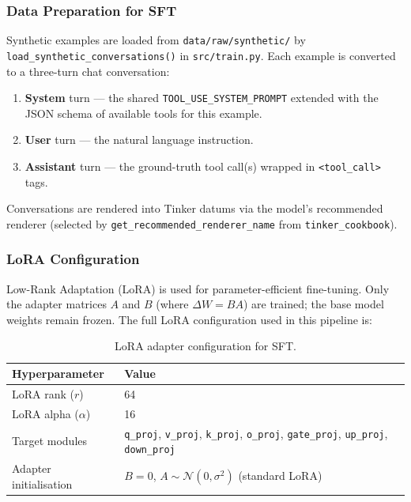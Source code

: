 \documentclass[12pt, a4paper]{article}
\newcommand{\thead}[1]{\textbf{#1}}
\begin{document}
\subsubsection{Data Preparation for SFT}

Synthetic examples are loaded from \texttt{data/raw/synthetic/} by
\texttt{load\_synthetic\_conversations()} in \texttt{src/train.py}. Each
example is converted to a three-turn chat conversation:

\begin{enumerate}[leftmargin=1.5em, itemsep=3pt]
  \item \textbf{System} turn --- the shared \texttt{TOOL\_USE\_SYSTEM\_PROMPT}
    extended with the JSON schema of available tools for this example.
  \item \textbf{User} turn --- the natural language instruction.
  \item \textbf{Assistant} turn --- the ground-truth tool call(s) wrapped in
    \texttt{<tool\_call>} tags.
\end{enumerate}

Conversations are rendered into Tinker datums via the model's recommended
renderer (selected by \texttt{get\_recommended\_renderer\_name} from
\texttt{tinker\_cookbook}).

\subsubsection{LoRA Configuration}

Low-Rank Adaptation (LoRA) is used for parameter-efficient fine-tuning. Only
the adapter matrices $A$ and $B$ (where $\Delta W = BA$) are trained; the base
model weights remain frozen. The full LoRA configuration used in this pipeline
is:

\begin{table}[H]
\centering
\caption{LoRA adapter configuration for SFT.}
\begin{tabularx}{\linewidth}{L{5cm} C{9.2cm}}
\toprule
\thead{Hyperparameter} & \thead{Value} \\
\midrule
LoRA rank ($r$) & 64 \\
LoRA alpha ($\alpha$) & 16 \\
Target modules & \texttt{q\_proj}, \texttt{v\_proj}, \texttt{k\_proj}, \texttt{o\_proj}, \texttt{gate\_proj}, \texttt{up\_proj}, \texttt{down\_proj} \\
Adapter initialisation & $B = 0$, $A \sim \mathcal{N}(0, \sigma^2)$ (standard LoRA) \\
\bottomrule
\end{tabularx}
\end{table}
\end{document}
